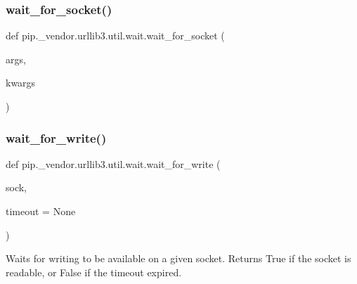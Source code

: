 \subsubsection{\texorpdfstring{wait\+\_\+for\+\_\+socket()}{wait\_for\_socket()}}
{\footnotesize\ttfamily def pip.\+\_\+vendor.\+urllib3.\+util.\+wait.\+wait\+\_\+for\+\_\+socket (\begin{DoxyParamCaption}\item[{}]{args,  }\item[{}]{kwargs }\end{DoxyParamCaption})}

\mbox{\label{namespacepip_1_1__vendor_1_1urllib3_1_1util_1_1wait_a0c5f8e9a88d1627e136d982a8f47935c}} 
\subsubsection{\texorpdfstring{wait\+\_\+for\+\_\+write()}{wait\_for\_write()}}
{\footnotesize\ttfamily def pip.\+\_\+vendor.\+urllib3.\+util.\+wait.\+wait\+\_\+for\+\_\+write (\begin{DoxyParamCaption}\item[{}]{sock,  }\item[{}]{timeout = {\ttfamily None} }\end{DoxyParamCaption})}

\begin{DoxyVerb}Waits for writing to be available on a given socket.
Returns True if the socket is readable, or False if the timeout expired.
\end{DoxyVerb}
 